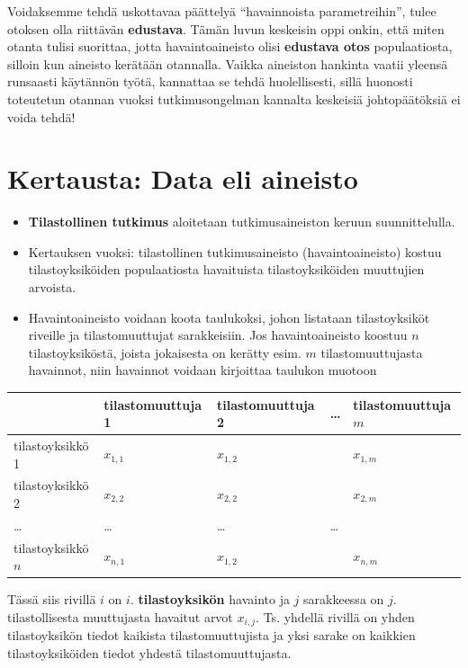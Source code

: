 \documentclass[
]{book}
\begin{document}
Voidaksemme tehdä uskottavaa päättelyä ``havainnoista parametreihin'', tulee otoksen olla riittävän \textbf{edustava}. Tämän luvun keskeisin oppi onkin, että miten otanta tulisi suorittaa, jotta havaintoaineisto olisi \textbf{edustava otos} populaatiosta, silloin kun aineisto kerätään otannalla. Vaikka aineiston hankinta vaatii yleensä runsaasti käytännön työtä, kannattaa se tehdä huolellisesti, sillä huonosti toteutetun otannan vuoksi tutkimusongelman kannalta keskeisiä johtopäätöksiä ei voida tehdä!

\hypertarget{alaluku51}{%
\section{Kertausta: Data eli aineisto}\label{alaluku51}}

\begin{itemize}
\item
  \textbf{Tilastollinen tutkimus} aloitetaan tutkimusaineiston keruun suunnittelulla.
\item
  Kertauksen vuoksi: tilastollinen tutkimusaineisto (havaintoaineisto) kostuu tilastoyksiköiden populaatiosta havaituista tilastoyksiköiden muuttujien arvoista.
\item
  Havaintoaineisto voidaan koota taulukoksi, johon listataan tilastoyksiköt riveille ja tilastomuuttujat sarakkeisiin. Jos havaintoaineisto koostuu \(n\) tilastoyksiköstä, joista jokaisesta on kerätty esim. \(m\) tilastomuuttujasta havainnot, niin havainnot voidaan kirjoittaa taulukon muotoon
\end{itemize}

\begin{longtable}[]{@{}lllll@{}}
\toprule
& tilastomuuttuja 1 & tilastomuuttuja 2 & \ldots{} & tilastomuuttuja \(m\) \\
\midrule
\endhead
tilastoyksikkö 1 & \(x_{1,1}\) & \(x_{1,2}\) & & \(x_{1,m}\) \\
tilastoyksikkö 2 & \(x_{2,2}\) & \(x_{2,2}\) & & \(x_{2,m}\) \\
\ldots{} & \ldots{} & \ldots{} & \ldots{} & \\
tilastoyksikkö \(n\) & \(x_{n,1}\) & \(x_{1,2}\) & & \(x_{n,m}\) \\
\bottomrule
\end{longtable}

Tässä siis rivillä \(i\) on \(i\). \textbf{tilastoyksikön} havainto ja \(j\) sarakkeessa on \(j\). tilastollisesta muuttujasta havaitut arvot \(x_{i,j}\). Ts. yhdellä rivillä on yhden tilastoyksikön tiedot kaikista tilastomuuttujista ja yksi sarake on kaikkien tilastoyksiköiden tiedot yhdestä tilastomuuttujasta.
\end{document}

